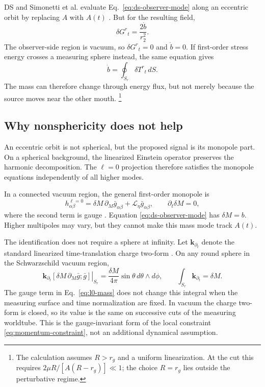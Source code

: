 \documentclass[aps,prd,10pt,onecolumn,nofootinbib,superscriptaddress,floatfix]{revtex4-2}
\begin{document}
DS and Simonetti et al. evaluate Eq.~\eqref{eq:ds-observer-mode} along an
eccentric orbit by replacing $A$ with $A(t)$
\cite{DaiStojkovic2019Observing,SimonettiEtAl2021SensitiveSearches}.  But for
the resulting field,
\begin{equation}
  \delta G^{r}{}_{t}=\frac{2\dot b}{r_2^{2}}.
  \label{eq:momentum-constraint}
\end{equation}
The observer-side region is vacuum, so $\delta G^{r}{}_{t}=0$ and
$\dot b=0$.  If first-order stress energy crosses a measuring sphere instead,
the same equation gives
\begin{equation}
  \dot b=\oint_{S_r}\delta T^{r}{}_{t}\,dS.
  \label{eq:mass-flux}
\end{equation}
The mass can therefore change through energy flux, but not merely because the
source moves near the other mouth.%
\footnote{The calculation assumes $R>r_g$ and a uniform linearization.  At the
cut this requires $2\mu R/[A(R-r_g)]\ll1$; the choice $R=r_g$ lies outside the
perturbative regime.}

\subsection{Why nonsphericity does not help}

An eccentric orbit is not spherical, but the proposed signal is its monopole
part.  On a spherical background, the linearized Einstein operator preserves
the harmonic decomposition.  The $\ell=0$ projection therefore satisfies the
monopole equations independently of all higher modes.

In a connected vacuum region, the general first-order monopole is
\begin{equation}
  h^{\ell=0}_{\alpha\beta}
  =\delta M\,\partial_M\bar g_{\alpha\beta}
   +\mathcal L_\eta\bar g_{\alpha\beta},
  \qquad \partial_t\delta M=0,
  \label{eq:l0-mass}
\end{equation}
where the second term is gauge
\cite{MartelPoisson2005SchwarzschildPerturbations}.  Equation
\eqref{eq:ds-observer-mode} has $\delta M=b$.  Higher multipoles may vary, but
they cannot make this mass mode track $A(t)$.

The identification does not require a sphere at infinity.  Let
$\bm k_{\partial_t}$ denote the standard linearized time-translation charge
two-form \cite{AbbottDeser1982Stability,IyerWald1994NoetherCharge,
BarnichBrandt2002CovariantTheory}.  On any round sphere in the Schwarzschild
vacuum region,
\begin{equation}
  \left.\bm k_{\partial_t}
  [\delta M\,\partial_M\bar g;\bar g]\right|_{S_r}
  =\frac{\delta M}{4\pi}\sin\theta\,d\theta\wedge d\phi,
  \qquad
  \int_{S_r}\bm k_{\partial_t}=\delta M.
  \label{eq:finite-sphere-mass}
\end{equation}
The gauge term in Eq.~\eqref{eq:l0-mass} does not change this integral when the
measuring surface and time normalization are fixed.  In vacuum the charge
two-form is closed, so its value is the same on successive cuts of the
measuring worldtube.  This is the gauge-invariant form of the local constraint
\eqref{eq:momentum-constraint}, not an additional dynamical assumption.
\end{document}
